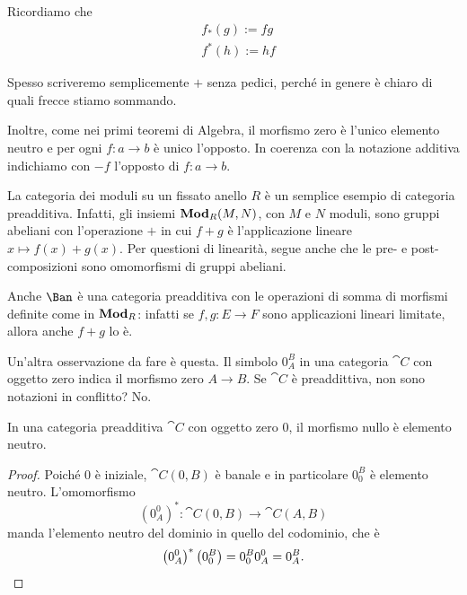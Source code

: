 \begin{recall}
  Ricordiamo che
  \begin{align*}
    & f_\ast(g) := f g \\
    & f^\ast(h) := h f
  \end{align*}
\end{recall}

Spesso scriveremo semplicemente \(+\) senza pedici, perché in genere è
chiaro di quali frecce stiamo sommando.

Inoltre, come nei primi teoremi di Algebra, il morfismo zero è l'unico
elemento neutro e per ogni \(f : a \to b\) è unico l'opposto. In
coerenza con la notazione additiva indichiamo con \(- f\) l'opposto di
\(f : a \to b\).

\begin{example}
  La categoria dei moduli su un fissato anello \(R\) è un semplice
  esempio di categoria preadditiva. Infatti, gli insiemi
  \(\mathbf{Mod}_R (M, N)\), con \(M\) e \(N\) moduli, sono gruppi abeliani con
  l'operazione \(+\) in cui \(f + g\) è l'applicazione lineare
  \(x \mapsto f(x) + g(x)\). Per questioni di linearità, segue anche che le
  pre- e post-composizioni sono omomorfismi di gruppi abeliani.
\end{example}

\begin{example}
  Anche \(\Ban\) è una categoria preadditiva con le operazioni di somma
  di morfismi definite come in \(\mathbf{Mod}_R\): infatti se \(f, g
  : E \to F\) sono applicazioni lineari limitate, allora anche \(f + g\)
  lo è.
\end{example}

Un'altra osservazione da fare è questa. Il simbolo \(0_A^B\) in una
categoria \(\cat C\) con oggetto zero indica il morfismo zero
\(A \to B\). Se \(\cat C\) è preaddittiva, non sono notazioni in
conflitto?  No.

\begin{proposition}
  In una categoria preadditiva \(\cat C\) con oggetto zero \(0\), il
  morfismo nullo è elemento neutro.
\end{proposition}

\begin{proof}
  Poiché \(0\) è iniziale, \(\cat C(0, B)\) è banale e in particolare
  \(0_0^B\) è elemento neutro. L'omomorfismo
  \[
    \left(0_A^0\right)^\ast : \cat C(0, B) \to \cat C(A, B)
  \]
  manda l'elemento neutro del dominio in quello del codominio, che è
  \[
    \left(0_A^0\right)^\ast\left(0_0^B\right) = 0_0^B 0_A^0 = 0_A^B
    . \qedhere
  \]
\end{proof}

